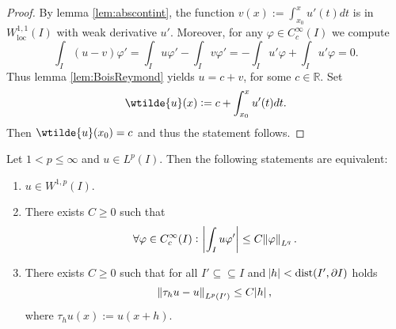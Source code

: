 \begin{proof}
	By lemma \ref{lem:abscontint}, the function $v(x) := \int_{x_0}^x u'(t)dt$ is in $W^{1,1}_{\mathrm{loc}}(I)$ with weak derivative $u'$. Moreover, for any $\varphi \in C^\infty_c(I)$ we compute
	\begin{equation*}
		\int_I (u - v)\varphi' = \int_I u\varphi' - \int_I v\varphi' = -\int_I u'\varphi + \int_I u'\varphi = 0.
	\end{equation*}
	Thus lemma \ref{lem:BoisReymond} yields $u = c + v$, for some $c \in \mathbb{R}$. Set
	\begin{equation*}
		\wtilde{u}(x) := c + \int_{x_0}^x u'(t) dt.
	\end{equation*}
	Then $\wtilde{u}(x_0) = c$ and thus the statement follows.
\end{proof}

\begin{theorem}[Characterization of $W^{1,p}(I)$]
	Let $1 < p \leq \infty$ and $u \in L^p(I)$. Then the following statements are equivalent:
	\begin{enumerate}[label = \textup{(}\alph*\textup{)},wide = 0pt]
		\item $u \in W^{1,p}(I)$.
		\item There exists $C \geq 0$ such that
			\begin{equation*}
				\forall \varphi \in C^\infty_c(I): \> \abs[3]{\int_I u\varphi'} \leq C\norm{\varphi}_{L^q}.
			\end{equation*}
		\item There exists $C \geq 0$ such that for all $I' \subseteq \subseteq I$ and $\abs{h} < \operatorname{dist}(I',\partial I)$ holds
			\begin{equation*}
				\norm{\tau_hu - u}_{L^p(I')} \leq C\abs{h},
			\end{equation*}
			\noindent where $\tau_hu(x) := u(x + h)$.
	\end{enumerate}
\end{theorem}

